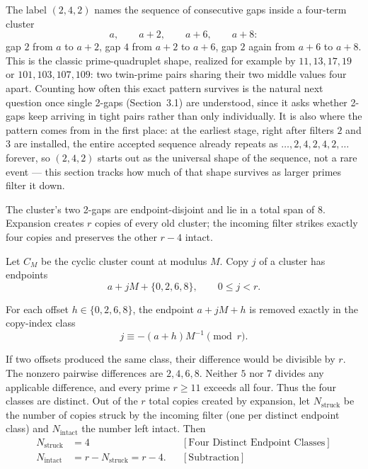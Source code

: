 The label $(2,4,2)$ names the sequence of consecutive gaps inside a
four-term cluster
\begin{equation*}
a,\qquad a+2,\qquad a+6,\qquad a+8:
\end{equation*}
gap $2$ from $a$ to $a+2$, gap $4$ from $a+2$ to $a+6$, gap $2$ again
from $a+6$ to $a+8$. This is the classic prime-quadruplet shape, realized
for example by $11,13,17,19$ or $101,103,107,109$: two twin-prime pairs
sharing their two middle values four apart. Counting how often this exact
pattern survives is the natural next question once single 2-gaps
(Section~3.1) are understood, since it asks whether 2-gaps keep arriving
in tight pairs rather than only individually. It is also where the
pattern comes from in the first place: at the earliest stage, right
after filters $2$ and $3$ are installed, the entire accepted sequence
already repeats as $\ldots,2,4,2,4,2,\ldots$ forever, so $(2,4,2)$ starts
out as the universal shape of the sequence, not a rare event --- this
section tracks how much of that shape survives as larger primes filter
it down.

The cluster's two 2-gaps are endpoint-disjoint and lie in a total span of
$8$. Expansion creates $r$ copies of every old cluster; the incoming
filter strikes exactly four copies and preserves the other $r-4$ intact.

Let $C_M$ be the cyclic cluster count at modulus $M$. Copy $j$ of a
cluster has endpoints
\begin{equation*}
a+jM+\{0,2,6,8\},
\qquad
0\le j\lt r.
\end{equation*}

For each offset $h\in\{0,2,6,8\}$, the endpoint $a+jM+h$ is removed
exactly in the copy-index class
\begin{equation*}
j\equiv-(a+h)M^{-1}\pmod r.
\end{equation*}

If two offsets produced the same class, their difference would be
divisible by $r$. The nonzero pairwise differences are $2,4,6,8$.
Neither $5$ nor $7$ divides any applicable difference, and every prime
$r\ge11$ exceeds all four. Thus the four classes are distinct. Out of the
$r$ total copies created by expansion, let $N_{\text{struck}}$ be the
number of copies struck by the incoming filter (one per distinct
endpoint class) and $N_{\text{intact}}$ the number left intact. Then
\begin{equation*}
\begin{aligned}
N_{\text{struck}}&=4
&&[\text{Four Distinct Endpoint Classes}]\\
N_{\text{intact}}&=r-N_{\text{struck}}=r-4.
&&[\text{Subtraction}]
\end{aligned}
\end{equation*}

